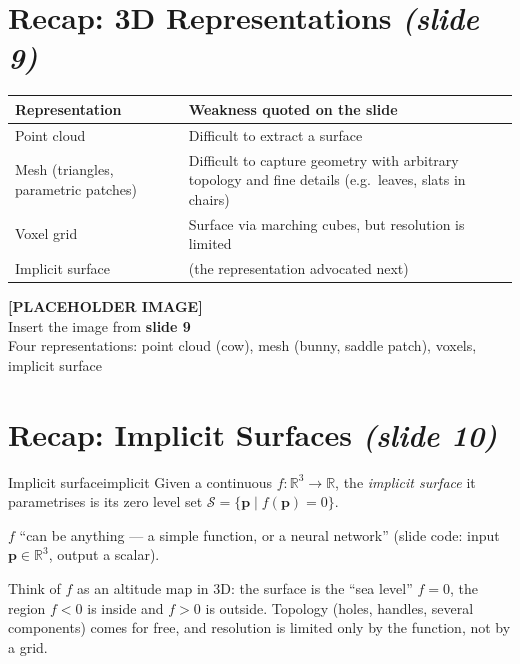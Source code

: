 \documentclass[11pt,a4paper]{article}
\newcommand{\R}{\mathbb{R}}
\newcommand{\bp}{{\bm{p}}}
\newcommand{\slideimg}[2]{%
  \begin{center}
  \begin{tcolorbox}[enhanced,colback=gray!8,colframe=gray!8,width=0.92\linewidth,
    halign=center,valign=center,height=3.4cm,
    overlay={\draw[dashed,gray!70,thick] (frame.south west) rectangle (frame.north east);}]
  \textbf{[PLACEHOLDER IMAGE]}\\ Insert the image from \textbf{#1}\\ {\small #2}
  \end{tcolorbox}
  \end{center}}
\begin{document}
\section{Recap: 3D Representations \emph{(slide 9)}}
\begin{center}
\begin{tabular}{@{}p{3.2cm}p{9.5cm}@{}}
\toprule
Representation & Weakness quoted on the slide\\
\midrule
Point cloud & Difficult to extract a surface\\
Mesh (triangles, parametric patches) & Difficult to capture geometry with arbitrary topology and fine details (e.g.\ leaves, slats in chairs)\\
Voxel grid & Surface via marching cubes, but resolution is limited\\
Implicit surface & (the representation advocated next)\\
\bottomrule
\end{tabular}
\end{center}
\slideimg{slide 9}{Four representations: point cloud (cow), mesh (bunny, saddle patch), voxels, implicit surface}

\section{Recap: Implicit Surfaces \emph{(slide 10)}}
\begin{Definition}{Implicit surface}{implicit}
Given a continuous $f:\R^3\to\R$, the \emph{implicit surface} it parametrises is its zero level set
$\mathcal S=\{\bp\mid f(\bp)=0\}$.
\end{Definition}
$f$ ``can be anything --- a simple function, or a neural network'' (slide code: input $\bp\in\R^3$, output a scalar).

\begin{intuition}
Think of $f$ as an altitude map in 3D: the surface is the ``sea level'' $f=0$, the region $f<0$ is inside and $f>0$
is outside. Topology (holes, handles, several components) comes for free, and resolution is limited only by the
function, not by a grid.
\end{intuition}

\end{document}
